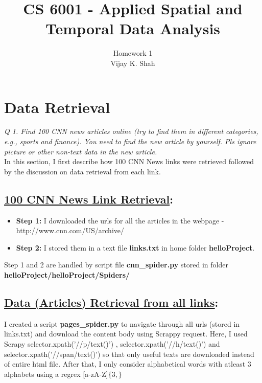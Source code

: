 \documentclass[journal,onecolumn]{IEEEtran}
\title{CS 6001 - Applied Spatial and Temporal Data Analysis}
\author{Homework 1 \\ Vijay K. Shah}
\begin{document}
\maketitle

\section{\textbf{Data Retrieval}}

\textit{Q 1. Find 100 CNN news articles online (try to find them in different categories, e.g., sports and
finance). You need to find the new article by yourself. Pls ignore picture or other non-text data
in the new article.} \\

In this section, I first describe how 100 CNN News links were retrieved followed by the discussion on data retrieval from each link.

\subsection{\underline{100 CNN News Link Retrieval}:}

\begin{itemize}[label={}]
\item \textbf{Step 1:} I downloaded the urls for all the articles in the webpage - http://www.cnn.com/US/archive/

\item \textbf{Step 2:} I stored them in a text file \textbf{links.txt} in home folder \textbf{helloProject}. 

\end{itemize}
Step 1 and 2 are handled by script file \textbf{cnn\_spider.py} stored in folder \textbf{helloProject/helloProject/Spiders/}


\subsection{\underline{Data (Articles) Retrieval from all links}:}

I created a script \textbf{pages\_spider.py} to navigate through all urls (stored in links.txt) and download the content body using Scrappy request. Here, I used Scrapy selector.xpath('//p/text()') ,  selector.xpath('//h/text()') and  selector.xpath('//span/text()') so that only useful texts are downloaded instead of entire html file. After that, I only consider alphabetical words with atleast 3 alphabets using a regrex [a-zA-Z]$\{3,\}$ \\
\end{document}
